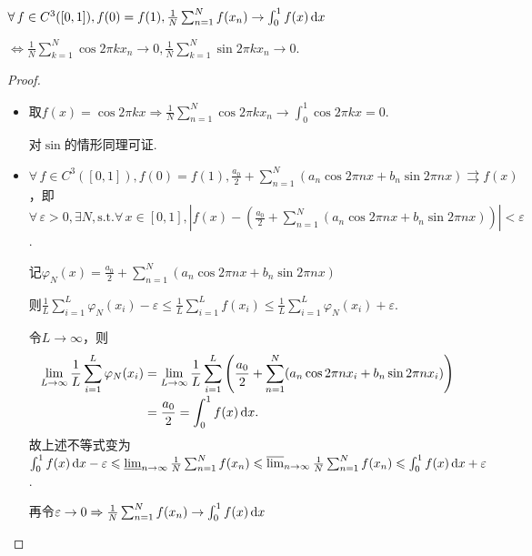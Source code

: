 \begin{theorem}
    $\forall\, f \in C^3([0,1]), f(0)=f(1),\frac{1}{N}\sum_{n=1}^N{f(x_n)}\to \int_{0}^{1}{f(x)}\mathop{}\!\mathrm{d} x$\par
    $\Leftrightarrow \frac{1}{N}\sum_{k=1}^N{\cos{2\pi kx_n}}\to 0,\frac{1}{N}\sum_{k=1}^N{\sin{2\pi kx_n}}\to 0$.\par
\end{theorem}
\begin{proof}
    \begin{itemize}
        \item[“$\Rightarrow$”] 取$f(x)=\cos{2\pi kx} \Rightarrow \frac{1}{N}\sum_{n=1}^N{\cos{2\pi kx_n}} \to \int_0^1{\cos{2\pi kx}} = 0$.\par
        对$\sin$的情形同理可证.
        \item[“$\Leftarrow$”] $\forall\, f \in C^3([0,1]),f(0)=f(1),\frac{a_0}{2}+\sum_{n=1}^N(a_n\cos{2\pi nx}+b_n\sin{2\pi nx})\rightrightarrows f(x)$，即$\forall\, \varepsilon>0,\exists N,\text{s.t.}\forall\, x\in [0,1] ,\left\lvert f(x) - \left(\frac{a_0}{2}+\sum_{n=1}^N(a_n\cos{2\pi nx}+b_n\sin{2\pi nx})\right)\right\rvert < \varepsilon$.\par
        记$\varphi_N(x) = \frac{a_0}{2}+\sum_{n=1}^N(a_n\cos{2\pi nx}+b_n\sin{2\pi nx})$\par
        则$\frac{1}{L}\sum_{i=1}^L{\varphi_N(x_i)} - \varepsilon \leq \frac{1}{L}\sum_{i=1}^L{f(x_i)} \leq \frac{1}{L}\sum_{i=1}^L{\varphi_N(x_i)} + \varepsilon$.\par
        令$L\to\infty$，则
        \begin{align*}
            \lim_{L\to\infty}\frac{1}{L}\sum_{i=1}^L{\varphi_N(x_i)}&=\lim_{L\to\infty}{\frac{1}{L}\sum_{i=1}^L{\left(\frac{a_0}{2}+\sum_{n=1}^N(a_n\cos{2\pi nx_i}+b_n\sin{2\pi nx_i})\right)}}\\[-2pt]
            &=\frac{a_0}{2}=\int_0^1{f(x)}\mathop{}\!\mathrm{d} x.
        \end{align*}
        故上述不等式变为$\int_0^1{f(x)}\mathop{}\!\mathrm{d} x-\varepsilon \leqslant \varliminf_{n\to\infty}{\frac{1}{N}\sum_{n=1}^N{f(x_n)}} \leqslant \varlimsup_{n\to\infty}{\frac{1}{N}\sum_{n=1}^N{f(x_n)}} \leqslant \int_0^1{f(x)}\mathop{}\!\mathrm{d} x+\varepsilon$.\par
        再令$\varepsilon\to 0 \Rightarrow \frac{1}{N}\sum_{n=1}^N{f(x_n)}\to \int_{0}^{1}{f(x)}\mathop{}\!\mathrm{d} x$
    \end{itemize}
\end{proof}\par\noindent

